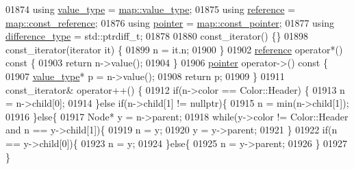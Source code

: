 \begin{DoxyCode}
01874         \textcolor{keyword}{using} \hyperlink{classaed2_1_1map_a719db98e0ff9a837610f76be33264680_a719db98e0ff9a837610f76be33264680}{value\_type} = \hyperlink{classaed2_1_1map_a719db98e0ff9a837610f76be33264680_a719db98e0ff9a837610f76be33264680}{map::value\_type};
01875         \textcolor{keyword}{using} \hyperlink{classaed2_1_1map_af4f147533b3c0207ab036c86ce13ec0d_af4f147533b3c0207ab036c86ce13ec0d}{reference} = \hyperlink{classaed2_1_1map_a277080d3db76f19df9319ecba16475a9_a277080d3db76f19df9319ecba16475a9}{map::const\_reference};
01876         \textcolor{keyword}{using} \hyperlink{classaed2_1_1map_a7394e98a23b86bc008ad73326b273fd5_a7394e98a23b86bc008ad73326b273fd5}{pointer} = \hyperlink{classaed2_1_1map_a1366fc3e227a49777cb748fc6d4e022b_a1366fc3e227a49777cb748fc6d4e022b}{map::const\_pointer};
01877         \textcolor{keyword}{using} \hyperlink{classaed2_1_1map_a2f55b88809000fcbfce1c6cfef1ba74d_a2f55b88809000fcbfce1c6cfef1ba74d}{difference\_type} = std::ptrdiff\_t;
01878 
01880         const\_iterator() \{\}
01898         const\_iterator(iterator it) \{
01899             n = it.n;
01900         \}
01902         \hyperlink{classaed2_1_1map_af4f147533b3c0207ab036c86ce13ec0d_af4f147533b3c0207ab036c86ce13ec0d}{reference} operator*()\textcolor{keyword}{ const  }\{
01903             \textcolor{keywordflow}{return} n->value();
01904         \}
01906         \hyperlink{classaed2_1_1map_a7394e98a23b86bc008ad73326b273fd5_a7394e98a23b86bc008ad73326b273fd5}{pointer} operator->()\textcolor{keyword}{ const }\{
01907             \hyperlink{classaed2_1_1map_a719db98e0ff9a837610f76be33264680_a719db98e0ff9a837610f76be33264680}{value\_type}* p = n->value();
01908             \textcolor{keywordflow}{return} p;
01909         \}
01911         const\_iterator& operator++()  \{
01912             \textcolor{keywordflow}{if}(n->color == Color::Header) \{
01913                 n = n->child[0];
01914             \}\textcolor{keywordflow}{else} \textcolor{keywordflow}{if}(n->child[1] != \textcolor{keyword}{nullptr})\{
01915                 n = min(n->child[1]);
01916             \}\textcolor{keywordflow}{else}\{
01917                 Node* y = n->parent;
01918                 \textcolor{keywordflow}{while}(y->color != Color::Header and n == y->child[1])\{
01919                     n = y;
01920                     y = y->parent;
01921                 \}
01922                 \textcolor{keywordflow}{if}(n == y->child[0])\{
01923                     n = y;
01924                 \}\textcolor{keywordflow}{else}\{
01925                     n = y->parent;
01926                 \}
01927             \}

\end{DoxyCode}
